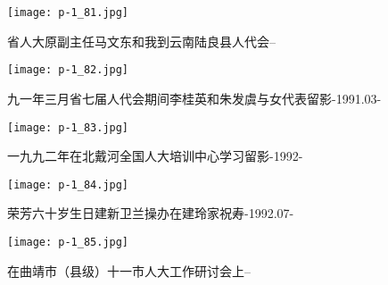 \clearpage


\begin{figure}
    \begin{center}
        \texttt{[image: p-1\_81.jpg]}
        \begin{shaded}
            \caption{省人大原副主任马文东和我到云南陆良县人代会--}
        \end{shaded}
    \end{center}
\end{figure}

\clearpage


\begin{figure}
    \begin{center}
        \texttt{[image: p-1\_82.jpg]}
        \begin{shaded}
            \caption{九一年三月省七届人代会期间李桂英和朱发虞与女代表留影-1991.03-}
        \end{shaded}
    \end{center}
\end{figure}

\clearpage


\begin{figure}
    \begin{center}
        \texttt{[image: p-1\_83.jpg]}
        \begin{shaded}
            \caption{一九九二年在北戴河全国人大培训中心学习留影-1992-}
        \end{shaded}
    \end{center}
\end{figure}

\clearpage


\begin{figure}
    \begin{center}
        \texttt{[image: p-1\_84.jpg]}
        \begin{shaded}
            \caption{荣芳六十岁生日建新卫兰操办在建玲家祝寿-1992.07-}
        \end{shaded}
    \end{center}
\end{figure}

\clearpage


\begin{figure}
    \begin{center}
        \texttt{[image: p-1\_85.jpg]}
        \begin{shaded}
            \caption{在曲靖市（县级）十一市人大工作研讨会上--}
        \end{shaded}
    \end{center}
\end{figure}

